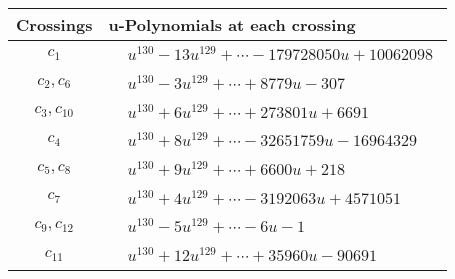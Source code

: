 \documentclass[1p]{elsarticle_modified}
\theoremstyle{definition}
\begin{document}
\begin{tabular}{m{50pt}|m{274pt}}
Crossings & \hspace{64pt}u-Polynomials at each crossing \\
\hline $$\begin{aligned}c_{1}\end{aligned}$$&$\begin{aligned}
&u^{130}-13 u^{129}+\cdots-179728050 u+10062098
\end{aligned}$\\
\hline $$\begin{aligned}c_{2},c_{6}\end{aligned}$$&$\begin{aligned}
&u^{130}-3 u^{129}+\cdots+8779 u-307
\end{aligned}$\\
\hline $$\begin{aligned}c_{3},c_{10}\end{aligned}$$&$\begin{aligned}
&u^{130}+6 u^{129}+\cdots+273801 u+6691
\end{aligned}$\\
\hline $$\begin{aligned}c_{4}\end{aligned}$$&$\begin{aligned}
&u^{130}+8 u^{129}+\cdots-32651759 u-16964329
\end{aligned}$\\
\hline $$\begin{aligned}c_{5},c_{8}\end{aligned}$$&$\begin{aligned}
&u^{130}+9 u^{129}+\cdots+6600 u+218
\end{aligned}$\\
\hline $$\begin{aligned}c_{7}\end{aligned}$$&$\begin{aligned}
&u^{130}+4 u^{129}+\cdots-3192063 u+4571051
\end{aligned}$\\
\hline $$\begin{aligned}c_{9},c_{12}\end{aligned}$$&$\begin{aligned}
&u^{130}-5 u^{129}+\cdots-6 u-1
\end{aligned}$\\
\hline $$\begin{aligned}c_{11}\end{aligned}$$&$\begin{aligned}
&u^{130}+12 u^{129}+\cdots+35960 u-90691
\end{aligned}$\\
\hline
\end{tabular}\\~\\
\end{document}
